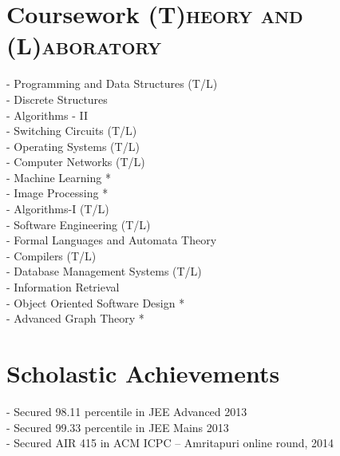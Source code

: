 \documentclass[a4paper,10pt]{extarticle} %
\begin{document}
\section{Coursework
\hfill\small\textsc{(T)heory and (L)aboratory}}

\begin{multicols}{2}
- Programming and Data Structures (T/L) \\
- Discrete Structures \\
- Algorithms - II \\
- Switching Circuits (T/L) \\
- Operating Systems (T/L) \\
- Computer Networks (T/L) \\
- Machine Learning * \\
- Image Processing * \\
- Algorithms-I (T/L) \\
- Software Engineering (T/L) \\
- Formal Languages and Automata Theory \\
- Compilers (T/L) \\
- Database Management Systems (T/L) \\
- Information Retrieval \\
- Object Oriented Software Design * \\
- Advanced Graph Theory *
\end{multicols}


\section{Scholastic Achievements}

- Secured 98.11 percentile in JEE Advanced 2013 \\
- Secured 99.33 percentile in JEE Mains 2013 \\ 
- Secured AIR 415 in ACM ICPC – Amritapuri online round, 2014


\end{document}
